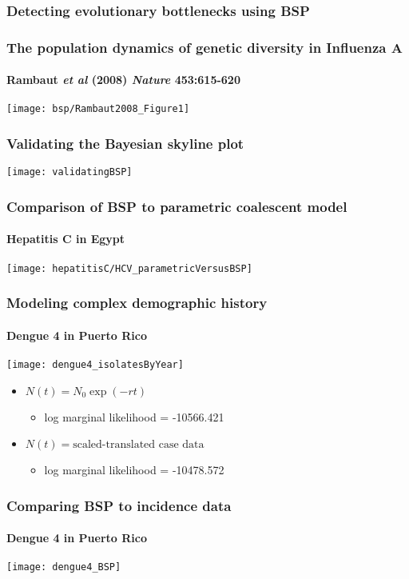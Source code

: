 \begin{frame}
\frametitle{Detecting evolutionary bottlenecks using BSP}
\end{frame}

\begin{frame}
\frametitle{The population dynamics of genetic diversity in Influenza A}
\framesubtitle{Rambaut {\it et al} (2008) {\it Nature} {\bf 453}:615-620}
\begin{centering}%
\texttt{[image: bsp/Rambaut2008\_Figure1]}%
\par%
\end{centering}%
\end{frame}

\begin{frame}
\frametitle{Validating the Bayesian skyline plot}
\begin{centering}%
\texttt{[image: validatingBSP]}%
\par%
\end{centering}%
\end{frame}

\begin{frame}
\frametitle{Comparison of BSP to parametric coalescent model}
\framesubtitle{Hepatitis C in Egypt}
\begin{centering}%
\texttt{[image: hepatitisC/HCV\_parametricVersusBSP]}%
\par%
\end{centering}%
\end{frame}

\begin{frame}
\frametitle{Modeling complex demographic history}
\framesubtitle{Dengue 4 in Puerto Rico}
\begin{centering}%
\texttt{[image: dengue4\_isolatesByYear]}%
\par%
\end{centering}%

\begin{itemize}
\item $N(t) = N_0\exp(-rt)$
  \begin{itemize}
  \item log marginal likelihood = -10566.421
  \end{itemize}
\item $N(t) = \mbox{scaled-translated case data}$
  \begin{itemize}
  \item log marginal likelihood = -10478.572
  \end{itemize}
\end{itemize}
\end{frame}

\begin{frame}
\frametitle{Comparing BSP to incidence data}
\framesubtitle{Dengue 4 in Puerto Rico}
\begin{centering}%
\texttt{[image: dengue4\_BSP]}%
\par%
\end{centering}%
\end{frame}
